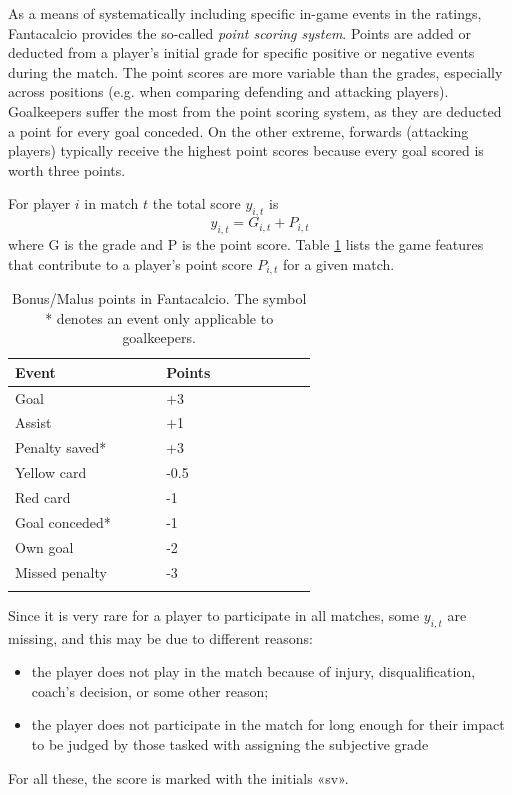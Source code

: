 \documentclass[a4paper,10pt]{report}
\begin{document}
As a means of systematically including specific in-game events in the ratings, Fantacalcio provides the so-called \textit{point scoring system}. Points are added or deducted from a player’s initial grade for specific positive or negative events during the match. The point scores are more variable than the grades, especially across positions (e.g. when comparing defending and attacking players). Goalkeepers suffer the most from the point scoring system, as they are deducted a point for every goal conceded. On the other extreme,
forwards (attacking players) typically receive the highest point scores because every goal scored is worth three points.

For player \(i\) in match \(t\) the total score \(y_{i,t}\) is
\[y_{i,t} = G_{i,t} + P_{i,t}\]
where G is the grade and P is the point score. Table \ref{table:points} lists the game features that contribute to a player’s point score \(P_{i,t}\) for a given match. 


\begin{longtable}{m{0.3\linewidth}|m{0.3\linewidth}}
  \textbf{Event} & \textbf{Points} \\ \hline \endhead
    Goal             & +3       \\ 
    Assist           & +1       \\ 
    Penalty saved*  & +3       \\ \hline
    Yellow card      & -0.5     \\ 
    Red card         & -1       \\ 
    Goal conceded*   & -1       \\ 
    Own goal         & -2       \\ 
    Missed penalty  & -3       \\ \hline
    
  \caption{Bonus/Malus points in Fantacalcio. The symbol * denotes an event only applicable to goalkeepers.}
  \label{table:points}
\end{longtable}


Since it is very rare for a player to participate in all matches, some  \(y_{i,t}\) are missing, and this may be due to different reasons: 
\begin{itemize}
\item the player does not play in the match because of injury, disqualification, coach’s decision, or some other
reason;
\item the player does not participate in the match for long enough for their impact to
be judged by those tasked with assigning the subjective grade
\end{itemize}
For all these, the score is marked with the initials «sv».
\end{document}
